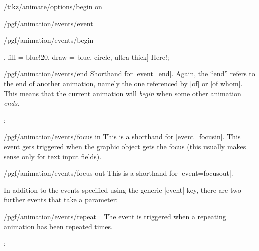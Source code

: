 \begin{key}{/tikz/animate/options/begin on=}
\begin{key}{/pgf/animation/events/event=}
\begin{key}{/pgf/animation/events/begin}
\begin{codeexample}[imagesource={standalone/pgfmanual-en-tikz-animations-animation-66.svg}]
{    },
    fill = blue!20, draw = blue, circle, ultra thick] {Here!};
\end{codeexample}
        \end{key}
        \begin{key}{/pgf/animation/events/end}
            Shorthand for |event=end|. Again, the ``end'' refers to the end of
            another animation, namely the one referenced by |of| or |of whom|.
            This means that the current animation will \emph{begin} when some
            other animation \emph{ends}.
\begin{codeexample}[imagesource={standalone/pgfmanual-en-tikz-animations-animation-67.svg}]
\tikz {};
\end{codeexample}
        \end{key}
        \begin{key}{/pgf/animation/events/focus in}
            This is a shorthand for |event=focusin|. This event gets triggered
            when the graphic object gets the focus (this usually makes sense
            only for text input fields).
        \end{key}
        \begin{key}{/pgf/animation/events/focus out}
            This is a shorthand for |event=focusout|.
        \end{key}
    \end{key}

    In addition to the events specified using the generic |event| key, there
    are two further events that take a parameter:
    \begin{key}{/pgf/animation/events/repeat=}
        The event is triggered when a repeating animation has been repeated
         times.
\begin{codeexample}[imagesource={standalone/pgfmanual-en-tikz-animations-animation-68.svg}]
\tikz
  ;
\end{codeexample}
    \end{key}


\end{key}
